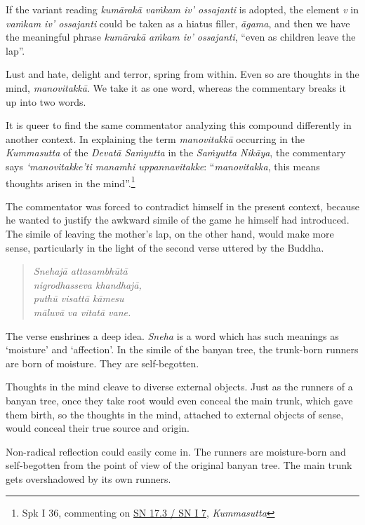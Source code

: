 If the variant reading \emph{kumārakā vaṁkam iv' ossajanti} is adopted, the element \emph{v} in \emph{vaṁkam iv' ossajanti} could be taken as a hiatus filler, \emph{āgama}, and then we have the meaningful phrase \emph{kumārakā aṁkam iv' ossajanti}, ``even as children leave the lap''.

Lust and hate, delight and terror, spring from within. Even so are thoughts in the mind, \emph{manovitakkā}. We take it as one word, whereas the commentary breaks it up into two words.

It is queer to find the same commentator analyzing this compound differently in another context. In explaining the term \emph{manovitakkā} occurring in the \emph{Kummasutta} of the \emph{Devatā Saṁyutta} in the \emph{Saṁyutta Nikāya}, the commentary says \emph{`manovitakke'ti manamhi uppannavitakke}: ``\emph{manovitakka}, this means thoughts arisen in the mind''.\footnote{Spk I 36, commenting on \href{https://suttacentral.net/sn17.3/pli/ms}{SN 17.3 / SN I 7}, \emph{Kummasutta}}

The commentator was forced to contradict himself in the present context, because he wanted to justify the awkward simile of the game he himself had introduced. The simile of leaving the mother's lap, on the other hand, would make more sense, particularly in the light of the second verse uttered by the Buddha.

\clearpage

\begin{quote}
\emph{Snehajā attasambhūtā}\\
\emph{nigrodhasseva khandhajā,}\\
\emph{puthū visattā kāmesu}\\
\emph{māluvā va vitatā vane.}
\end{quote}

The verse enshrines a deep idea. \emph{Sneha} is a word which has such meanings as `moisture' and `affection'. In the simile of the banyan tree, the trunk-born runners are born of moisture. They are self-begotten.

Thoughts in the mind cleave to diverse external objects. Just as the runners of a banyan tree, once they take root would even conceal the main trunk, which gave them birth, so the thoughts in the mind, attached to external objects of sense, would conceal their true source and origin.

Non-radical reflection could easily come in. The runners are moisture-born and self-begotten from the point of view of the original banyan tree. The main trunk gets overshadowed by its own runners.

